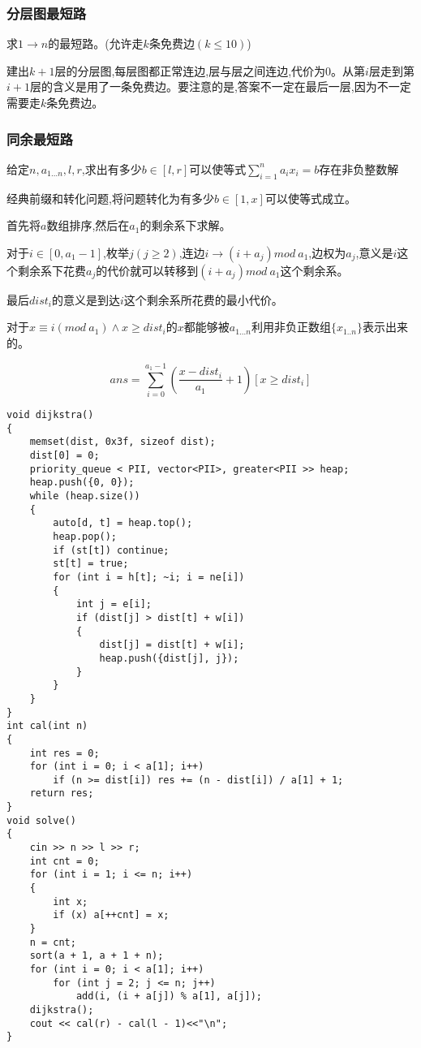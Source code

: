 \documentclass[a4paper, fontset=none]{ctexart}
\begin{document}
\subsubsection{分层图最短路}

求$1\rightarrow n$的最短路。(允许走$k$条免费边$(k\leqslant 10)$)

建出$k+1$层的分层图,每层图都正常连边,层与层之间连边,代价为0。从第$i$层走到第$i+1$层的含义是用了一条免费边。要注意的是,答案不一定在最后一层,因为不一定需要走$k$条免费边。
\subsubsection{同余最短路}

给定$n, a_{1...n}, l, r$,求出有多少$b\in [l, r]$可以使等式$\sum\limits_{i=1}^n{a_ix_i}=b$存在非负整数解

经典前缀和转化问题,将问题转化为有多少$b\in [1, x]$可以使等式成立。

首先将$a$数组排序,然后在$a_1$的剩余系下求解。

对于$i\in [0, a_1-1]$,枚举$j(j\ge 2)$,连边$i\rightarrow (i+a_j)mod\ a_1$,边权为$a_j$,意义是$i$这个剩余系下花费$a_j$的代价就可以转移到$(i+a_j)mod\ a_1$这个剩余系。

最后$dist_i$的意义是到达$i$这个剩余系所花费的最小代价。

对于$x\equiv i(mod\ a_1)\wedge x\ge dist_i$的$x$都能够被$a_{1...n}$利用非负正数组$\{x_{1..n}\}$表示出来的。

$$ans=\sum\limits_{i=0}^{a_1-1}{(\frac{x-dist_i}{a_1}+1)[x\geqslant dist_i]}$$


\begin{verbatim}
void dijkstra()
{
    memset(dist, 0x3f, sizeof dist);
    dist[0] = 0;
    priority_queue < PII, vector<PII>, greater<PII >> heap;
    heap.push({0, 0});
    while (heap.size())
    {
        auto[d, t] = heap.top();
        heap.pop();
        if (st[t]) continue;
        st[t] = true;
        for (int i = h[t]; ~i; i = ne[i])
        {
            int j = e[i];
            if (dist[j] > dist[t] + w[i])
            {
                dist[j] = dist[t] + w[i];
                heap.push({dist[j], j});
            }
        }
    }
}
int cal(int n)
{
    int res = 0;
    for (int i = 0; i < a[1]; i++)
        if (n >= dist[i]) res += (n - dist[i]) / a[1] + 1;
    return res;
}
void solve()
{
    cin >> n >> l >> r;
    int cnt = 0;
    for (int i = 1; i <= n; i++)
    {
        int x;
        if (x) a[++cnt] = x;
    }
    n = cnt;
    sort(a + 1, a + 1 + n);
    for (int i = 0; i < a[1]; i++)
        for (int j = 2; j <= n; j++)
            add(i, (i + a[j]) % a[1], a[j]);
    dijkstra();
    cout << cal(r) - cal(l - 1)<<"\n";
}
\end{verbatim}
\end{document}
